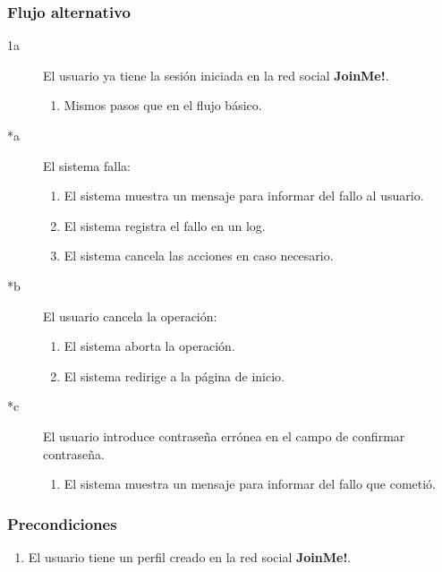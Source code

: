 \documentclass[12pt, a4paper, titlepage]{article}
\begin{document}
\subsubsection{Flujo alternativo}
\begin{description}
	\item [1a] El usuario ya tiene la sesión iniciada en la red social \textbf{JoinMe!}.
		\begin{enumerate}
			\item Mismos pasos que en el flujo básico.
		\end{enumerate}
\end{description}

\begin{description}
\item [*a] El sistema falla:
	\begin{enumerate}
		\item El sistema muestra un mensaje para informar del fallo al usuario.
		\item El sistema registra el fallo en un log.
		\item El sistema cancela las acciones en caso necesario.
	\end{enumerate}
\end{description}

\begin{description}
	\item [*b] El usuario cancela la operación:
	\begin{enumerate}
		\item El sistema aborta la operación.
		\item El sistema redirige a la página de inicio.
	\end{enumerate}
\end{description}

\begin{description}
	\item [*c] El usuario introduce contraseña errónea en el campo de confirmar contraseña.
	\begin{enumerate}
		\item El sistema muestra un mensaje para informar del fallo que cometió.
	\end{enumerate}
\end{description}

\subsubsection{Precondiciones}
\begin{enumerate}
	\item El usuario tiene un perfil creado en la red social \textbf{JoinMe!}.
\end{enumerate}
\end{document}
